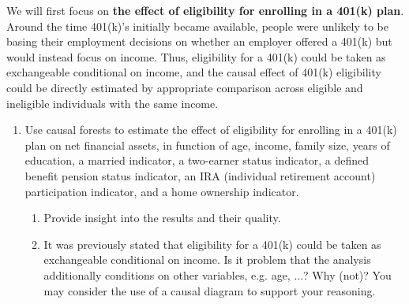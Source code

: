 \documentclass[11pt,fleqn]{article}
\begin{document}
We will first focus on {\bf the effect of eligibility for enrolling in a 401(k) plan}. Around the time 401(k)’s initially became available, people were unlikely to be basing their employment decisions on whether an employer offered a 401(k) but would instead focus on income. Thus, eligibility for a 401(k) could be taken as exchangeable conditional on income, and the causal effect of 401(k) eligibility could be directly estimated by appropriate comparison across eligible and ineligible individuals with the same income. 
\begin{enumerate}
\item Use causal forests to estimate the effect of eligibility for enrolling in a 401(k) plan on net financial assets, in function of age, income, family size, years of education, a married indicator, a two-earner status indicator, a defined benefit pension status indicator, an IRA (individual retirement account) participation indicator, and a home ownership indicator. 
\begin{enumerate}
\item Provide insight into the results and their quality. 
\item It was previously stated that eligibility for a 401(k) could be taken as exchangeable conditional on income. Is it problem that the analysis additionally conditions on other variables, e.g. age, ...? Why (not)? You may consider the use of a causal diagram to support your reasoning.
\end{enumerate}


\end{enumerate}
\end{document}
